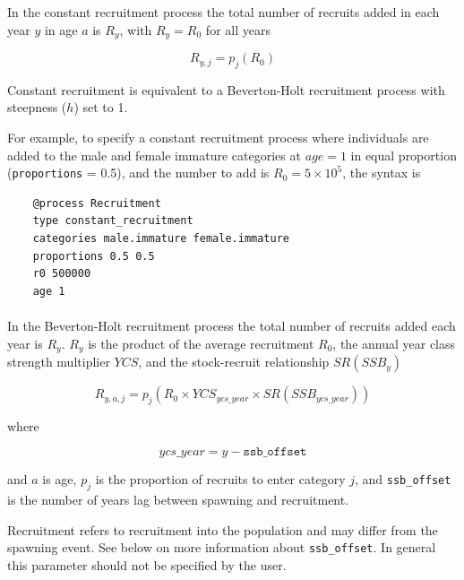 In the constant recruitment process the total number of recruits added in each year $y$ in age $a$ is $R_y$, with $R_y = R_0$ for all years

\begin{equation}
  R_{y,j} = p_j(R_0)
\end{equation}

Constant recruitment is equivalent to a Beverton-Holt recruitment process with steepness ($h$) set to 1.

For example, to specify a constant recruitment process where individuals are added to the male and female immature categories at $age=1$ in equal proportion (\texttt{proportions} = 0.5), and the number to add is $R_0=5 \times 10^5$, the syntax is

{\small{\begin{verbatim}
	@process Recruitment
	type constant_recruitment
	categories male.immature female.immature
	proportions 0.5 0.5
	r0 500000
	age 1
\end{verbatim}}}

\paragraph{}\label{subsubsec:BH-recruitment}

In the Beverton-Holt recruitment process the total number of recruits added each year is $R_y$. $R_y$ is the product of the average recruitment $R_0$, the annual year class strength multiplier $YCS$, and the stock-recruit relationship $SR(SSB_y)$

\begin{equation}\label{eq:BH}
  R_{y,a,j} = p_j(R_0 \times YCS_{ycs\_year} \times SR(SSB_{ycs\_year}))
\end{equation}

where

\begin{equation}\label{eq:year_class}
ycs\_year = y - \texttt{ssb\_offset}
\end{equation}

and $a$ is age, $p_j$ is the proportion of recruits to enter category $j$, and \texttt{ssb\_offset} is the number of years lag between spawning and recruitment.

Recruitment refers to recruitment into the population and may differ from the spawning event. See below on more information about \texttt{ssb\_offset}. In general this parameter should not be specified by the user.

